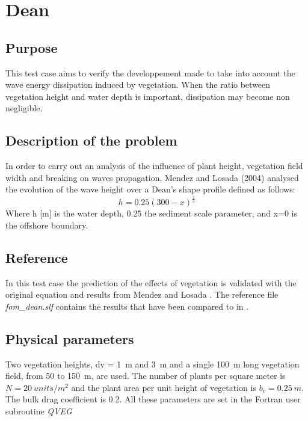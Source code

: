 \section{Dean}
%

%
\subsection{Purpose}
%
This test case aims to verify the developpement made to take into account the wave energy dissipation induced by vegetation. When the ratio between vegetation height and water depth is important, dissipation may become non negligible.
%
\subsection{Description of the problem}
%
In order to carry out an analysis of the influence of plant height, vegetation field width and breaking on waves propagation, Mendez and Losada (2004) analysed the evolution of the wave height over a Dean’s shape profile \cite{Dean1991} defined as follows:
$$	
h=0.25(300-x)^\frac{2}{3}
$$
Where h [m] is the water depth, 0.25 the sediment scale parameter, and x=0 is the offshore boundary.

\subsection{Reference}
%
In this test case the prediction of the effects of vegetation is validated with the original equation and results from Mendez and Losada  \cite{Mendez2004}.
The reference file {\it fom\_dean.slf} contains the results that have been compared to \cite{Mendez2004} in \cite{Bacchi2014}.

\subsection{Physical parameters}
%
Two vegetation heights, dv = 1~m and 3~m and a single 100~m long vegetation field, from 50 to 150~m, are used. The number of plants per square meter is $N = 20~units/m^2$ and the plant area per unit height of vegetation is $b_v = 0.25~m.$ The bulk drag coefficient is 0.2. All these parameters are set in the Fortran user subroutine {\it QVEG}

